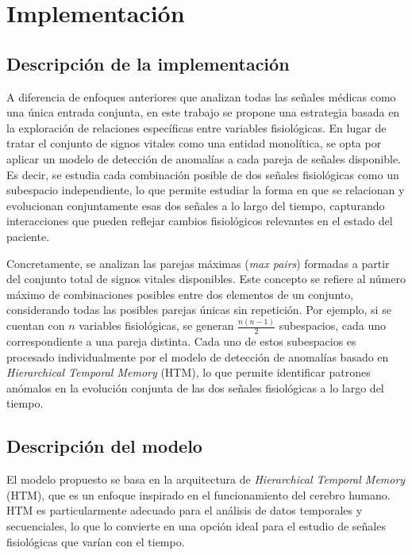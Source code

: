 \chapter{Implementación}

\section{Descripción de la implementación}

A diferencia de enfoques anteriores que analizan todas las señales médicas como una única entrada conjunta, en este trabajo se propone una estrategia basada en la exploración de relaciones específicas entre variables fisiológicas. En lugar de tratar el conjunto de signos vitales como una entidad monolítica, se opta por aplicar un modelo de detección de anomalías a cada pareja de señales disponible. Es decir, se estudia cada combinación posible de dos señales fisiológicas como un subespacio independiente, lo que permite estudiar la forma en que se relacionan y evolucionan conjuntamente esas dos señales a lo largo del tiempo, capturando interacciones que pueden reflejar cambios fisiológicos relevantes en el estado del paciente.

Concretamente, se analizan las parejas máximas (\textit{max pairs}) formadas a partir del conjunto total de signos vitales disponibles. Este concepto se refiere al número máximo de combinaciones posibles entre dos elementos de un conjunto, considerando todas las posibles parejas únicas sin repetición. Por ejemplo, si se cuentan con $n$ variables fisiológicas, se generan $\frac{n(n-1)}{2}$ subespacios, cada uno correspondiente a una pareja distinta. Cada uno de estos subespacios es procesado individualmente por el modelo de detección de anomalías basado en \textit{Hierarchical Temporal Memory }(HTM), lo que permite identificar patrones anómalos en la evolución conjunta de las dos señales fisiológicas a lo largo del tiempo.

\section{Descripción del modelo}

El modelo propuesto se basa en la arquitectura de \textit{Hierarchical Temporal Memory} (HTM), que es un enfoque inspirado en el funcionamiento del cerebro humano. HTM es particularmente adecuado para el análisis de datos temporales y secuenciales, lo que lo convierte en una opción ideal para el estudio de señales fisiológicas que varían con el tiempo.

